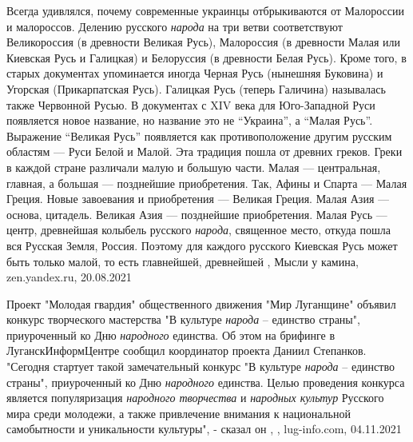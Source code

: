 Всегда удивлялся, почему современные украинцы отбрыкиваются от Малороссии и
малороссов. Делению русского \emph{народа} на три ветви соответствуют Великороссия (в
древности Великая Русь), Малороссия (в древности Малая или Киевская Русь и
Галицкая) и Белоруссия (в древности Белая Русь). Кроме того, в старых
документах упоминается иногда Черная Русь (нынешняя Буковина) и Угорская
(Прикарпатская Русь). Галицкая Русь (теперь Галичина) называлась также
Червонной Русью.  В документах с XIV века для Юго-Западной Руси появляется
новое название, но название это не \enquote{Украина}, а \enquote{Малая Русь}.
Выражение \enquote{Великая Русь} появляется как противоположение другим русским
областям — Руси Белой и Малой. Эта традиция пошла от древних греков. Греки в
каждой стране различали малую и большую части.  Малая — центральная, главная, а
большая — позднейшие приобретения. Так, Афины и Спарта — Малая Греция. Новые
завоевания и приобретения — Великая Греция. Малая Азия — основа, цитадель.
Великая Азия — позднейшие приобретения. Малая Русь — центр, древнейшая колыбель
русского \emph{народа}, священное место, откуда пошла вся Русская Земля,
Россия. Поэтому для каждого русского Киевская Русь может быть только малой, то
есть главнейшей, древнейшей
, Мысли у камина, zen.yandex.ru, 20.08.2021

Проект "Молодая гвардия" общественного движения "Мир Луганщине" объявил конкурс
творческого мастерства "В культуре \emph{народа} – единство страны",
приуроченный ко Дню \emph{народного} единства. Об этом на брифинге в
ЛуганскИнформЦентре сообщил координатор проекта Даниил Степанков.  "Сегодня
стартует такой замечательный конкурс "В культуре \emph{народа} – единство
страны", приуроченный ко Дню \emph{народного} единства. Целью проведения
конкурса является популяризация \emph{народного творчества} и \emph{народных
культур} Русского мира среди молодежи, а также привлечение внимания к
национальной самобытности и уникальности культуры", - сказал он
, 
, lug-info.com, 04.11.2021
